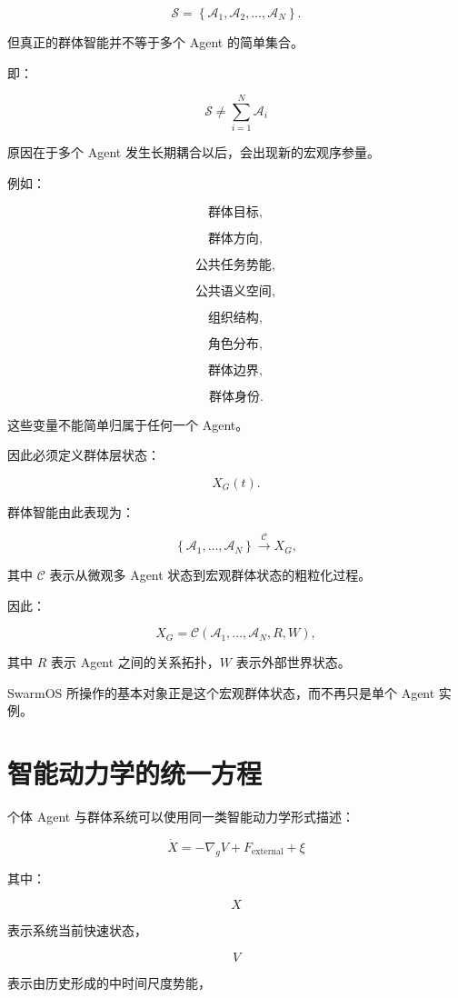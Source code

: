 \[
\mathcal{S}
=
\left\{
\mathcal{A}_1,
\mathcal{A}_2,
\ldots,
\mathcal{A}_N
\right\}.
\]

但真正的群体智能并不等于多个 Agent 的简单集合。

即：

\[
\boxed{
\mathcal{S}
\neq
\sum_{i=1}^{N}\mathcal{A}_i
}
\]

原因在于多个 Agent 发生长期耦合以后，会出现新的宏观序参量。

例如：

\[
\text{群体目标},
\]

\[
\text{群体方向},
\]

\[
\text{公共任务势能},
\]

\[
\text{公共语义空间},
\]

\[
\text{组织结构},
\]

\[
\text{角色分布},
\]

\[
\text{群体边界},
\]

\[
\text{群体身份}.
\]

这些变量不能简单归属于任何一个 Agent。

因此必须定义群体层状态：

\[
X_G(t).
\]

群体智能由此表现为：

\[
\left\{
\mathcal{A}_1,
\dots,
\mathcal{A}_N
\right\}
\xrightarrow{\mathcal{C}}
X_G,
\]

其中 $\mathcal{C}$ 表示从微观多 Agent 状态到宏观群体状态的粗粒化过程。

因此：

\[
X_G
=
\mathcal{C}
\left(
\mathcal{A}_1,
\dots,
\mathcal{A}_N,
R,
W
\right),
\]

其中 $R$ 表示 Agent 之间的关系拓扑，$W$ 表示外部世界状态。

SwarmOS 所操作的基本对象正是这个宏观群体状态，而不再只是单个 Agent 实例。


\section{智能动力学的统一方程}

个体 Agent 与群体系统可以使用同一类智能动力学形式描述：

\[
\boxed{
\dot X
=
-\nabla_g V
+
F_{\mathrm{external}}
+
\xi
}
\]

其中：

\[
X
\]

表示系统当前快速状态，

\[
V
\]

表示由历史形成的中时间尺度势能，

